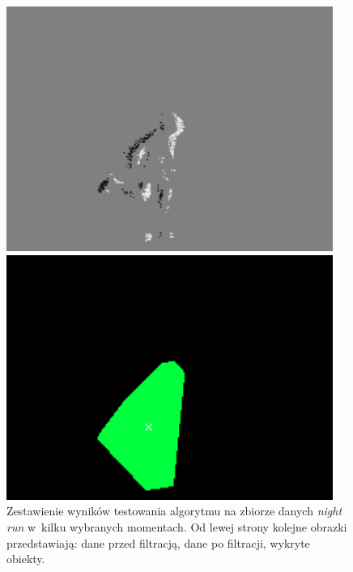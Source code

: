 \begin{figure}
\begin{minipage}{0.33\textwidth}
        \includegraphics[width = 0.95\textwidth]{images/filtered_run3.png}
    \end{minipage}\hfill
    \begin{minipage}{0.33\textwidth}
        \centering
        \includegraphics[width = 0.95\textwidth]{images/obst_run3.png}
    \end{minipage}
    \caption{Zestawienie wyników testowania algorytmu na zbiorze danych \textit{night run} w~kilku wybranych momentach. Od lewej strony kolejne obrazki przedstawiają: dane przed filtracją, dane po filtracji, wykryte obiekty.}
    \label{fig:run_overview}
\end{figure}



